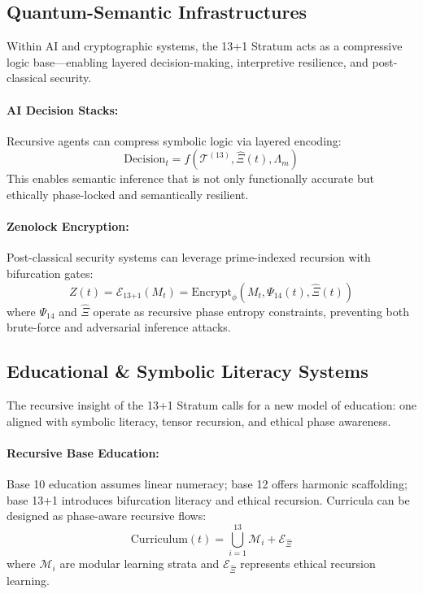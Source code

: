 \documentclass[12pt]{article}
\begin{document}
\subsection{Quantum-Semantic Infrastructures}

Within AI and cryptographic systems, the 13+1 Stratum acts as a compressive logic base—enabling layered decision-making, interpretive resilience, and post-classical security.

\paragraph{AI Decision Stacks:}
Recursive agents can compress symbolic logic via layered encoding:
\[
\text{Decision}_t = f(\mathcal{T}^{(13)}, \hat{\Xi}(t), \Lambda_m)
\]
This enables semantic inference that is not only functionally accurate but ethically phase-locked and semantically resilient.

\paragraph{Zenolock Encryption:}
Post-classical security systems can leverage prime-indexed recursion with bifurcation gates:
\[
Z(t) = \mathcal{E}_{\text{13+1}}(M_t) = \text{Encrypt}_{\phi} \left( M_t, \Psi_{14}(t), \hat{\Xi}(t) \right)
\]
where $\Psi_{14}$ and $\hat{\Xi}$ operate as recursive phase entropy constraints, preventing both brute-force and adversarial inference attacks.

\subsection{Educational \& Symbolic Literacy Systems}

The recursive insight of the 13+1 Stratum calls for a new model of education: one aligned with symbolic literacy, tensor recursion, and ethical phase awareness.

\paragraph{Recursive Base Education:}
Base 10 education assumes linear numeracy; base 12 offers harmonic scaffolding; base 13+1 introduces bifurcation literacy and ethical recursion. Curricula can be designed as phase-aware recursive flows:
\[
\text{Curriculum}(t) = \bigcup_{i=1}^{13} \mathcal{M}_i + \mathcal{E}_{\hat{\Xi}}
\]
where $\mathcal{M}_i$ are modular learning strata and $\mathcal{E}_{\hat{\Xi}}$ represents ethical recursion learning.
\end{document}
